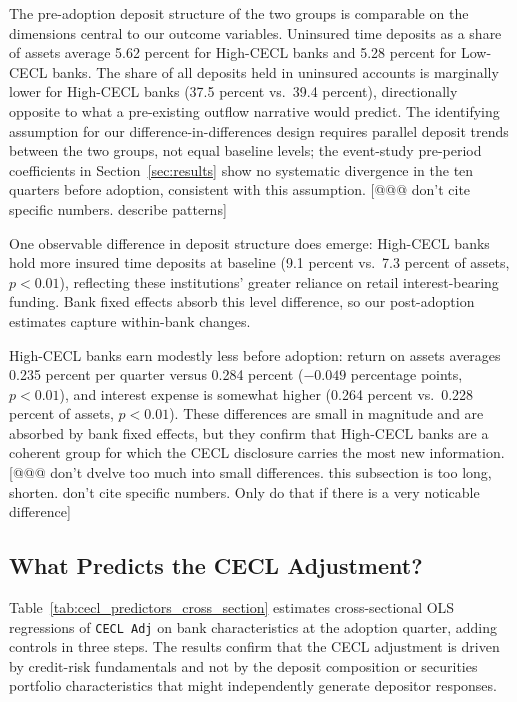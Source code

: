 The pre-adoption deposit structure of the two groups is comparable on the
dimensions central to our outcome variables.  Uninsured time deposits as a share
of assets average 5.62 percent for High-CECL banks and 5.28 percent for
Low-CECL banks.  The share of all deposits held in uninsured accounts is
marginally lower for High-CECL banks (37.5 percent vs.\ 39.4 percent),
directionally opposite to what a pre-existing outflow narrative would predict.
The identifying assumption for our difference-in-differences design requires
parallel deposit trends between the two groups, not equal baseline levels; the
event-study pre-period coefficients in Section~\ref{sec:results} show no
systematic divergence in the ten quarters before adoption, consistent with this
assumption. [@@@ don't cite specific numbers. describe patterns]

One observable difference in deposit structure does emerge: High-CECL banks hold
more insured time deposits at baseline (9.1 percent vs.\ 7.3 percent of assets,
$p < 0.01$), reflecting these institutions' greater reliance on retail
interest-bearing funding.  Bank fixed effects absorb this level difference, so
our post-adoption estimates capture within-bank changes.

High-CECL banks earn modestly less before adoption: return on assets averages
0.235 percent per quarter versus 0.284 percent ($-0.049$ percentage points,
$p < 0.01$), and interest expense is somewhat higher (0.264 percent vs.\
0.228 percent of assets, $p < 0.01$).  These differences are small in magnitude
and are absorbed by bank fixed effects, but they confirm that High-CECL banks
are a coherent group for which the CECL disclosure carries the most new
information.
[@@@ don't dvelve too much into small differences. this subsection is too long, shorten. don't cite specific numbers. Only do that if there is a very noticable difference]

\subsection{What Predicts the CECL Adjustment?}
\label{sec:descriptive:predictors}

Table~\ref{tab:cecl_predictors_cross_section} estimates cross-sectional OLS
regressions of \texttt{CECL Adj} on bank characteristics at the adoption
quarter, adding controls in three steps.  The results confirm that the CECL
adjustment is driven by credit-risk fundamentals and not by the deposit
composition or securities portfolio characteristics that might independently
generate depositor responses.

